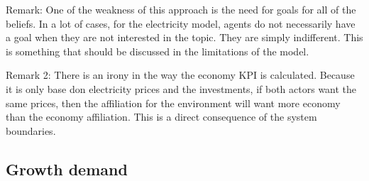 %		
%
%					
%					
%

Remark: One of the weakness of this approach is the need for goals for all of the beliefs. In a lot of cases, for the electricity model, agents do not necessarily have a goal when they are not interested in the topic. They are simply indifferent. This is something that should be discussed in the limitations of the model.

Remark 2: There is an irony in the way the economy KPI is calculated. Because it is only base don electricity prices and the investments, if both actors want the same prices, then the affiliation for the environment will want more economy than the economy affiliation. This is a direct consequence of the system boundaries.


\subsection{Growth demand}

